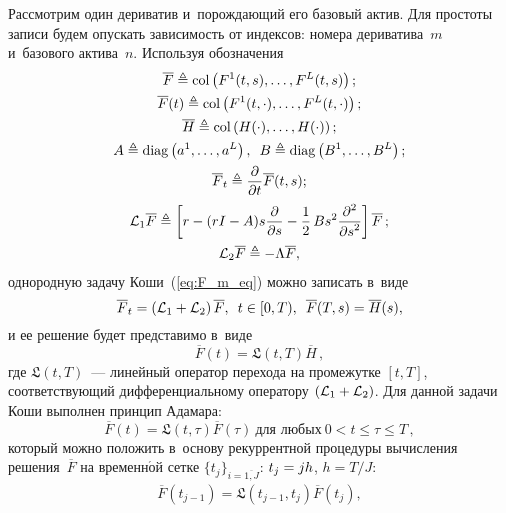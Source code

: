 \begin{multicols}{2}
Рассмотрим один дериватив и~по\-рож\-да\-ющий его базовый актив. 
Для прос\-то\-ты записи будем опускать за\-ви\-си\-мость от индексов: номера дериватива~$m$ и~базового актива~$n$. Используя обо\-зна\-чения
\begin{gather*}
\overline{F} \triangleq \mathrm{col}\left(F^1(t,s), \ldots, F^L(t,s)\right); \\
\overline{F}(t) \triangleq \mathrm{col}\left (F^1(t,\cdot), \ldots, F^L(t,\cdot)\right); \\
\overline{H} \triangleq \mathrm{col}\left(H(\cdot), \ldots, H(\cdot)\right);
\\
A \triangleq \mathrm{diag}\left (a^1,\ldots, a^L\right), \enskip B \triangleq \mathrm{diag}\left(B^1,\ldots, B^L\right);
\\
\overline{F}_t \triangleq \displaystyle\frac{\displaystyle \partial\mathstrut}{\displaystyle \partial t\mathstrut} \overline{F} (t,s); \\
\mathcal{L}_1\overline{F} \triangleq
\left[
r - (rI-A)s\displaystyle\frac{\displaystyle \partial\mathstrut}{\displaystyle \partial s\mathstrut} - \displaystyle\frac{\displaystyle 1\mathstrut}{\displaystyle 2\mathstrut}\, B s^2\displaystyle\frac{\displaystyle \partial^2\mathstrut}{\displaystyle \partial s^2\mathstrut}
\right] \overline{F}\,; \\
 \mathcal{L}_2\overline{F} \triangleq - \Lambda \overline{F},
\end{gather*}
однородную задачу Коши~(\ref{eq:F_m_eq}) мож\-но записать в~\mbox{виде}
\begin{equation*}
\overline{F}_t = \left( \mathcal{L}_1 + \mathcal{L}_2 \right)\overline{F}, \enskip
t \in [0,T), \enskip
\overline{F}(T,s) =\overline{H}(s) ,
\end{equation*}
и ее решение будет пред\-ста\-ви\-мо в~\mbox{виде}
\begin{equation*}
\overline{F}(t) = \mathfrak{L}(t,T)\overline{H}\,,
\end{equation*}
где $\mathfrak{L}(t,T)$~--- линейный оператор перехода на промежутке $[t,T]$, со\-от\-вет\-ст\-ву\-ющий дифференциальному оператору $ \left( \mathcal{L}_1 
\hm+ \mathcal{L}_2 \right)$. Для данной задачи Коши выполнен прин\-цип Ада\-мара:
\begin{equation*}
\overline{F}(t) =  \mathfrak{L}(t,\tau) \overline{F}(\tau) \ \mbox{для любых} \ 0 < t \leqslant \tau \leqslant T\,,
\end{equation*}
который можно положить в~основу рекуррентной процедуры вы\-чис\-ле\-ния решения~$\overline{F}$ на временн$\acute{\mbox{о}}$й сетке 
$\{t_j\}_{i=\overline{1,J}}$: $t_j \hm= j h$, $h = {T}/{J}$:
\begin{multline}
\overline{F}(t_{j-1}) =  \mathfrak{L}(t_{j-1},t_j) \overline{F}(t_j), \\[2pt]

\end{multline}
\end{multicols}
